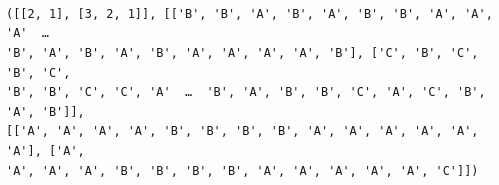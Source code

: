 \documentclass[11pt]{article}
\makeatletter
\newcommand{\boxspacing}{\kern\kvtcb@left@rule\kern\kvtcb@boxsep}
\newcommand{\prompt}[4]{
        {\ttfamily\llap{{\color{#2}[#3]:\hspace{3pt}#4}}\vspace{-\baselineskip}}
    }
\makeatother
\begin{document}
    \begin{Verbatim}[commandchars=\\\{\}]

    \end{Verbatim}

    \begin{center}
    \end{center}
    { \hspace*{\fill} \\}
    
    \begin{center}
    \end{center}
    { \hspace*{\fill} \\}
    
    \begin{Verbatim}[commandchars=\\\{\}]

    \end{Verbatim}

    \begin{center}
    \end{center}
    { \hspace*{\fill} \\}
    
    \begin{Verbatim}[commandchars=\\\{\}]

    \end{Verbatim}

            \begin{tcolorbox}[breakable, size=fbox, boxrule=.5pt, pad at break*=1mm, opacityfill=0]
\prompt{Out}{outcolor}{27}{\boxspacing}
\begin{Verbatim}[commandchars=\\\{\}]
([[2, 1], [3, 2, 1]], [['B', 'B', 'A', 'B', 'A', 'B', 'B', 'A', 'A', 'A'  …
'B', 'A', 'B', 'A', 'B', 'A', 'A', 'A', 'A', 'B'], ['C', 'B', 'C', 'B', 'C',
'B', 'B', 'C', 'C', 'A'  …  'B', 'A', 'B', 'B', 'C', 'A', 'C', 'B', 'A', 'B']],
[['A', 'A', 'A', 'A', 'B', 'B', 'B', 'B', 'A', 'A', 'A', 'A', 'A', 'A'], ['A',
'A', 'A', 'A', 'B', 'B', 'B', 'B', 'A', 'A', 'A', 'A', 'A', 'C']])
\end{Verbatim}
\end{tcolorbox}
        
\end{document}
